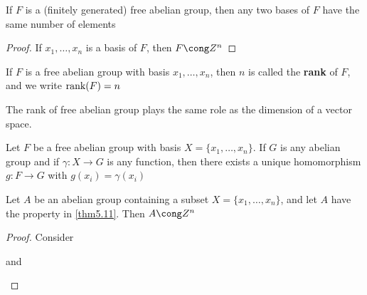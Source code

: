 \documentclass[11pt]{article}
\begin{document}
\begin{corollary}[]
If \(F\) is a (finitely generated) free abelian group, then any two bases of
\(F\) have the same number of elements
\end{corollary}

\begin{proof}
If \(x_1,\dots,x_n\) is a basis of \(F\), then \(F\cong\Z^n\)
\end{proof}

\begin{definition}[]
If \(F\) is a free abelian group with basis \(x_1,\dots,x_n\), then \(n\) is
called the \textbf{rank} of \(F\), and we write \(\text{rank}(F)=n\)
\end{definition}

The rank of free abelian group plays the same role as the dimension of a
vector space.

\begin{theorem}[]
\label{thm5.11}
Let \(F\) be a free abelian group with basis \(X=\{x_1,\dots,x_n\}\). If \(G\)
is any abelian group and if \(\gamma:X\to G\) is any function, then there exists
a unique homomorphism \(g:F\to G\) with \(g(x_i)=\gamma(x_i)\)

\begin{center}
\end{center}
\end{theorem}

\begin{proposition}[]
Let \(A\) be an abelian group containing a subset \(X=\{x_1,\dots,x_n\}\), and
let \(A\) have the property in \ref{thm5.11}. Then \(A\cong\Z^n\)
\end{proposition}

\begin{proof}
Consider
\begin{center}
\hspace{0.2cm}
and
\hspace{0.4cm}
\end{center}
\end{proof}
\end{document}
